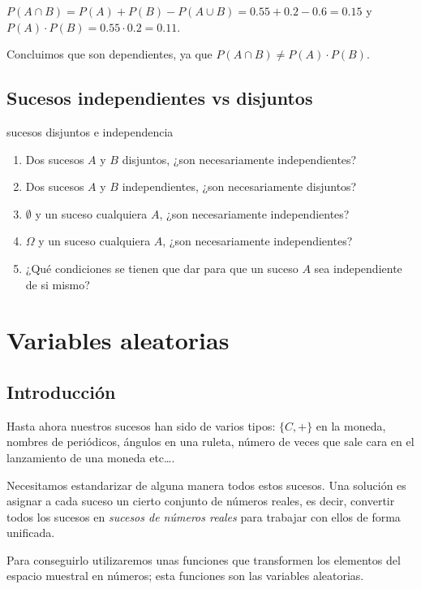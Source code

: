 \documentclass[
  letterpaper,
  DIV=11,
  numbers=noendperiod]{scrreprt}
\providecommand{\tightlist}{%
  \setlength{\itemsep}{0pt}\setlength{\parskip}{0pt}}\usepackage{longtable,booktabs,array}
\begin{document}
\(P(A\cap B)=P(A)+P(B)-P(A\cup B)=0.55+0.2-0.6=0.15\) y
\(P(A)\cdot P(B) = 0.55\cdot 0.2=0.11.\)

Concluimos que son dependientes, ya que
\(P(A\cap B)\neq P(A)\cdot P(B)\).

\section{Sucesos independientes vs
disjuntos}\label{sucesos-independientes-vs-disjuntos}

sucesos disjuntos e independencia

\begin{enumerate}
\def\labelenumi{\arabic{enumi}.}
\tightlist
\item
  Dos sucesos \(A\) y \(B\) disjuntos, ¿son necesariamente
  independientes?
\item
  Dos sucesos \(A\) y \(B\) independientes, ¿son necesariamente
  disjuntos?
\item
  \(\emptyset\) y un suceso cualquiera \(A\), ¿son necesariamente
  independientes?
\item
  \(\Omega\) y un suceso cualquiera \(A\), ¿son necesariamente
  independientes?
\item
  ¿Qué condiciones se tienen que dar para que un suceso \(A\) sea
  independiente de si mismo?
\end{enumerate}

\chapter{Variables aleatorias}\label{variables-aleatorias}

\section{Introducción}\label{introducciuxf3n}

Hasta ahora nuestros sucesos han sido de varios tipos: \(\{C,+\}\) en la
moneda, nombres de periódicos, ángulos en una ruleta, número de veces
que sale cara en el lanzamiento de una moneda etc\ldots.

Necesitamos estandarizar de alguna manera todos estos sucesos. Una
solución es asignar a cada suceso un cierto conjunto de números reales,
es decir, convertir todos los sucesos en \emph{sucesos de números
reales} para trabajar con ellos de forma unificada.

Para conseguirlo utilizaremos unas funciones que transformen los
elementos del espacio muestral en números; esta funciones son las
variables aleatorias.
\end{document}
